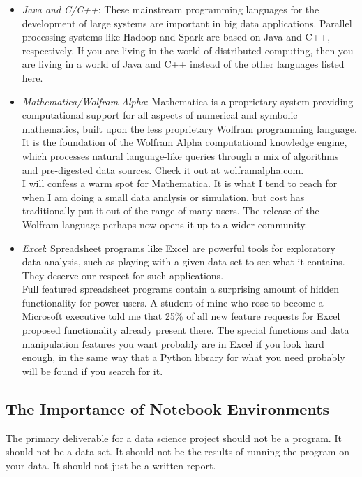 \documentclass[10pt]{article}
\begin{document}
\begin{itemize}
  \item \textit{Java and C/C++}: These mainstream programming languages for the development of large systems are important in big data applications. Parallel processing systems like Hadoop and Spark are based on Java and C++, respectively. If you are living in the world of distributed computing, then you are living in a world of Java and C++ instead of the other languages listed here.
  
  \item \textit{Mathematica/Wolfram Alpha}: Mathematica is a proprietary system providing computational support for all aspects of numerical and symbolic mathematics, built upon the less proprietary Wolfram programming language. It is the foundation of the Wolfram Alpha computational knowledge engine, which processes natural language-like queries through a mix of algorithms and pre-digested data sources. Check it out at \href{http://www.wolframalpha.com}{wolframalpha.com}.\\
I will confess a warm spot for Mathematica. It is what I tend to reach for when I am doing a small data analysis or simulation, but cost has traditionally put it out of the range of many users. The release of the Wolfram language perhaps now opens it up to a wider community.
  
  \item \textit{Excel}: Spreadsheet programs like Excel are powerful tools for exploratory data analysis, such as playing with a given data set to see what it contains. They deserve our respect for such applications.\\
Full featured spreadsheet programs contain a surprising amount of hidden functionality for power users. A student of mine who rose to become a Microsoft executive told me that 25\% of all new feature requests for Excel proposed functionality already present there. The special functions and data manipulation features you want probably are in Excel if you look hard enough, in the same way that a Python library for what you need probably will be found if you search for it.
\end{itemize}

\subsection{The Importance of Notebook Environments}
The primary deliverable for a data science project should not be a program. It should not be a data set. It should not be the results of running the program on your data. It should not just be a written report.
\end{document}
